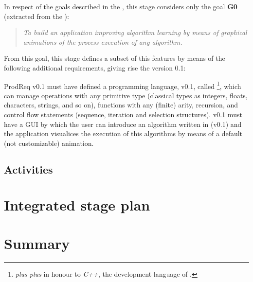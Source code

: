 \documentclass[twocolumn, 9pt]{extarticle}
\begin{document}
In respect of the goals described in the \favc, this stage considers
only the goal \textbf{G0} (extracted from the \favc):

\begin{quote}
  \textit{To build an application improving algorithm learning by means of
  graphical animations of the process execution of any algorithm.}
\end{quote}

From this goal, this stage defines a subset of this features by means
of the following additional requirements, giving rise the \fav version
0.1:

\begin{labeledpars}[4]{ProdReq}
   \fav v0.1 must have defined a \fav
  programming language, v0.1, called \favpp\footnote{\fav \textit{plus plus} in
    honour to \textit{C++}, the development language of \fav.}, which
  can manage operations with any primitive type (classical types as
  integers, floats, characters, strings, and so on), functions with
  any (finite) arity, recursion, and control flow statements (sequence,
  iteration and selection structures).
   \fav v0.1 must have a GUI by which the user can
  introduce an algorithm written in \favpp (v0.1) and the application
  visualices the execution of this algorithms by means of a default
  (not customizable) animation.
\end{labeledpars}

\subsection{Activities}

\section{Integrated stage plan}

\section{Summary}
\end{document}
